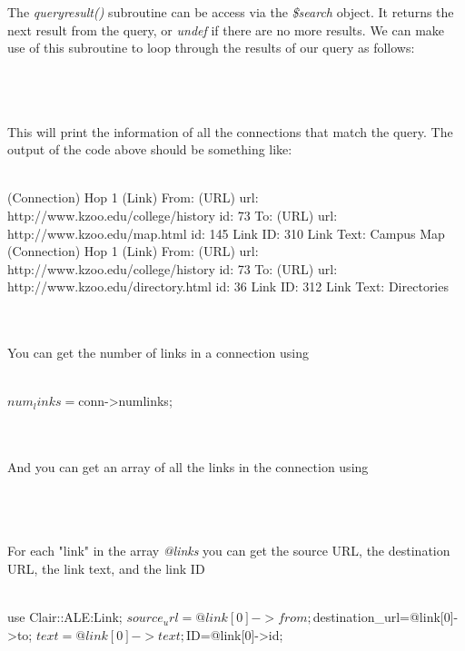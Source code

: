 The \emph{queryresult()} subroutine can be access via the \emph{\$search} object. It returns the next result from the query, or \emph{undef} if there are no more results. We can make use of this subroutine to loop through the results of our query as follows:
\\
\\
\\
\\
This will print the information of all the connections that match the query. The output of the code above should be something like:
\\
\\
\begin{boxedverbatim}
 (Connection)
 Hop 1
    (Link)
    From:
        (URL)
        url: http://www.kzoo.edu/college/history
         id: 73
    To:
        (URL)
        url: http://www.kzoo.edu/map.html
         id: 145
    Link ID: 310
    Link Text: Campus Map
 (Connection)
 Hop 1
    (Link)
    From:
        (URL)
        url: http://www.kzoo.edu/college/history
         id: 73
    To:
        (URL)
        url: http://www.kzoo.edu/directory.html
         id: 36
    Link ID: 312
    Link Text: Directories
\end{boxedverbatim}
\\
\\
You can get the number of links in a connection using
\\
\\
\begin{boxedverbatim}
 $num_links = $conn->{numlinks};
\end{boxedverbatim}
\\
\\
And you can get an array of all the links in the connection using
\\
\\
\\
\\
For each "link" in the array \emph{@links} you can get the source URL, the destination URL, the link text, and the link ID
\\
\\
\begin{boxedverbatim}
  use Clair::ALE:Link;
  $source_url=@link[0]->{from};
  $destination_url=@link[0]->{to};
  $text=@link[0]->{text};
  $ID=@link[0]->{id};
\end{boxedverbatim}
\\
\\
